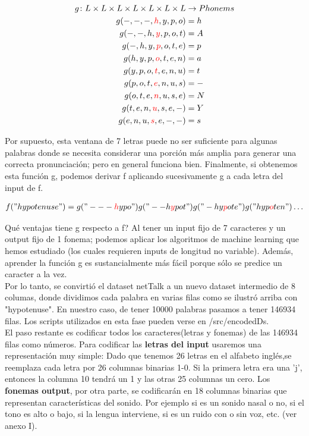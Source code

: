 \documentclass[paper=a4, fontsize=11pt]{scrartcl} %
\numberwithin{equation}{section} %
\numberwithin{figure}{section} %
\numberwithin{table}{section} %
\begin{document}
\begin{align*}
  g \colon L \times L \times L \times L \times L \times L \times L  & \to Phonems \\
  g(-,-,-,\textcolor{red}{h},y,p,o) &= h \\  
  g(-,-,h,\textcolor{red}{y},p,o,t) &= A \\
  g(-,h,y,\textcolor{red}{p},o,t,e) &= p \\
  g(h,y,p,\textcolor{red}{o},t,e,n) &= a \\
  g(y,p,o,\textcolor{red}{t},e,n,u) &= t \\
  g(p,o,t,\textcolor{red}{e},n,u,s)& = - \\
  g(o,t,e,\textcolor{red}{n},u,s,e)& = N \\
  g(t,e,n,\textcolor{red}{u},s,e,-)& = Y \\
  g(e,n,u,\textcolor{red}{s},e,-,-) &= s
\end{align*}

Por supuesto, esta ventana de 7 letras puede no ser suficiente para algunas palabras donde se necesita considerar una porción más amplia para generar una correcta pronunciación; pero en general funciona bien. Finalmente, si obtenemos esta función g, podemos derivar f aplicando sucesivamente g a cada letra del input de f. 

\begin{align*}
  f("hypotenuse") = g("---\textcolor{red}{h}ypo")  g("--h\textcolor{red}{y}pot") g("-hy\textcolor{red}{p}ote") g("hyp\textcolor{red}{o}ten")  \ldots
\end{align*}


Qué ventajas tiene g respecto a f? Al tener un input fijo de 7 caracteres y un output fijo de 1 fonema; podemos aplicar los algoritmos de machine learning que hemos estudiado (los cuales requieren inputs de longitud no variable). Además, aprender la función g es sustancialmente más fácil porque sólo se predice un caracter a la vez. \\

Por lo tanto, se convirtió el dataset netTalk a un nuevo dataset intermedio de 8 columas, donde dividimos cada palabra en varias filas como se ilustró arriba con "hypotenuse". En nuestro caso, de tener 10000 palabras pasamos a tener 146934 filas. Los scripts utilizados en esta fase pueden verse en /src/encodedDs. \\

El paso restante es codificar todos los caracteres(letras y fonemas) de las 146934 filas como números. Para codificar las \textbf{letras del input} usaremos una representación muy simple: Dado que tenemos 26 letras en el alfabeto inglés,se reemplaza cada letra por 26 columnas binarias 1-0. Si la primera letra era una 'j', entonces la columna 10 tendrá un 1 y las otras 25 columnas un cero. Los \textbf{fonemas output}, por otra parte, se codificarán en 18 columnas binarias que representan características del sonido. Por ejemplo si es un sonido nasal o no, si el tono es alto o bajo, si la lengua interviene, si es un ruido con o sin voz, etc. (ver anexo I). \\ 
\end{document}

